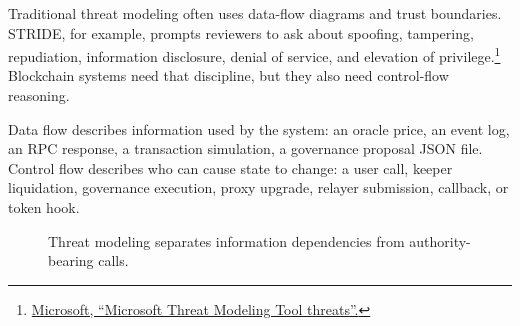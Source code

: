 Traditional threat modeling often uses data-flow diagrams and trust boundaries. STRIDE, for example, prompts reviewers to ask about spoofing, tampering, repudiation, information disclosure, denial of service, and elevation of privilege.\footnote{\href{https://learn.microsoft.com/en-us/azure/security/develop/threat-modeling-tool-threats}{Microsoft, ``Microsoft Threat Modeling Tool threats''.}} Blockchain systems need that discipline, but they also need control-flow reasoning.

Data flow describes information used by the system: an oracle price, an event log, an RPC response, a transaction simulation, a governance proposal JSON file. Control flow describes who can cause state to change: a user call, keeper liquidation, governance execution, proxy upgrade, relayer submission, callback, or token hook.

\begin{figure}[htbp]
\centering
{}
\caption{Threat modeling separates information dependencies from authority-bearing calls.}
\end{figure}

